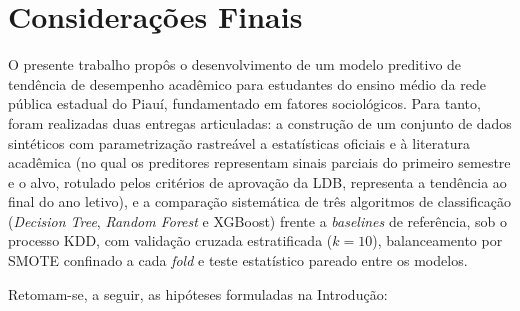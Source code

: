 \chapter{Considerações Finais}

O presente trabalho propôs o desenvolvimento de um modelo preditivo de tendência de desempenho acadêmico para estudantes do ensino médio da rede pública estadual do Piauí, fundamentado em fatores sociológicos. Para tanto, foram realizadas duas entregas articuladas: a construção de um conjunto de dados sintéticos com parametrização rastreável a estatísticas oficiais e à literatura acadêmica (no qual os preditores representam sinais parciais do primeiro semestre e o alvo, rotulado pelos critérios de aprovação da LDB, representa a tendência ao final do ano letivo), e a comparação sistemática de três algoritmos de classificação (\textit{Decision Tree}, \textit{Random Forest} e XGBoost) frente a \textit{baselines} de referência, sob o processo KDD, com validação cruzada estratificada ($k=10$), balanceamento por SMOTE confinado a cada \textit{fold} e teste estatístico pareado entre os modelos.

Retomam-se, a seguir, as hipóteses formuladas na Introdução:

